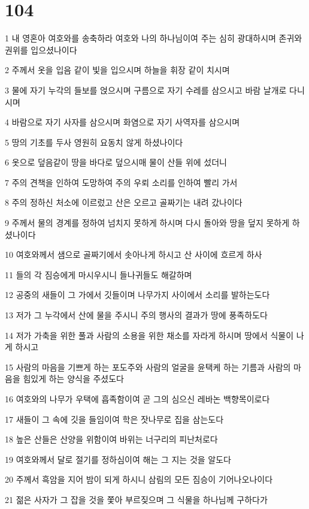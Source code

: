 \chapter{104}

\par 1 내 영혼아 여호와를 송축하라 여호와 나의 하나님이여 주는 심히 광대하시며 존귀와 권위를 입으셨나이다
\par 2 주께서 옷을 입음 같이 빛을 입으시며 하늘을 휘장 같이 치시며
\par 3 물에 자기 누각의 들보를 얹으시며 구름으로 자기 수레를 삼으시고 바람 날개로 다니시며
\par 4 바람으로 자기 사자를 삼으시며 화염으로 자기 사역자를 삼으시며
\par 5 땅의 기초를 두사 영원히 요동치 않게 하셨나이다
\par 6 옷으로 덮음같이 땅을 바다로 덮으시매 물이 산들 위에 섰더니
\par 7 주의 견책을 인하여 도망하여 주의 우뢰 소리를 인하여 빨리 가서
\par 8 주의 정하신 처소에 이르렀고 산은 오르고 골짜기는 내려 갔나이다
\par 9 주께서 물의 경계를 정하여 넘치지 못하게 하시며 다시 돌아와 땅을 덮지 못하게 하셨나이다
\par 10 여호와께서 샘으로 골짜기에서 솟아나게 하시고 산 사이에 흐르게 하사
\par 11 들의 각 짐승에게 마시우시니 들나귀들도 해갈하며
\par 12 공중의 새들이 그 가에서 깃들이며 나무가지 사이에서 소리를 발하는도다
\par 13 저가 그 누각에서 산에 물을 주시니 주의 행사의 결과가 땅에 풍족하도다
\par 14 저가 가축을 위한 풀과 사람의 소용을 위한 채소를 자라게 하시며 땅에서 식물이 나게 하시고
\par 15 사람의 마음을 기쁘게 하는 포도주와 사람의 얼굴을 윤택케 하는 기름과 사람의 마음을 힘있게 하는 양식을 주셨도다
\par 16 여호와의 나무가 우택에 흡족함이여 곧 그의 심으신 레바논 백향목이로다
\par 17 새들이 그 속에 깃을 들임이여 학은 잣나무로 집을 삼는도다
\par 18 높은 산들은 산양을 위함이여 바위는 너구리의 피난처로다
\par 19 여호와께서 달로 절기를 정하심이여 해는 그 지는 것을 알도다
\par 20 주께서 흑암을 지어 밤이 되게 하시니 삼림의 모든 짐승이 기어나오나이다
\par 21 젊은 사자가 그 잡을 것을 쫓아 부르짖으며 그 식물을 하나님께 구하다가
